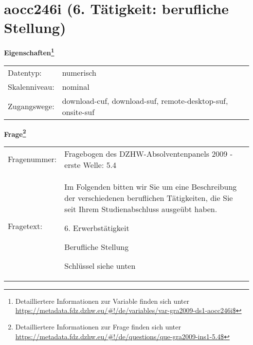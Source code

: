 
    \setcounter{footnote}{0}

    \vspace*{-1.8cm}
	\section{aocc246i (6. Tätigkeit: berufliche Stellung)}
	\label{section:aocc246i}



    \vspace*{0.5cm}
    \noindent\textbf{Eigenschaften\footnote{Detailliertere Informationen zur Variable finden sich unter
		\url{https://metadata.fdz.dzhw.eu/\#!/de/variables/var-gra2009-ds1-aocc246i$}}}\\
	\begin{tabularx}{\hsize}{@{}lX}
	Datentyp: & numerisch \\
	Skalenniveau: & nominal \\
	Zugangswege: &
	  download-cuf, 
	  download-suf, 
	  remote-desktop-suf, 
	  onsite-suf
 \\
    \end{tabularx}



				\vspace*{0.5cm}
                \noindent\textbf{Frage\footnote{Detailliertere Informationen zur Frage finden sich unter
		              \url{https://metadata.fdz.dzhw.eu/\#!/de/questions/que-gra2009-ins1-5.4$}}}\\
				\begin{tabularx}{\hsize}{@{}lX}
					Fragenummer: &
					  Fragebogen des DZHW-Absolventenpanels 2009 - erste Welle:
					  5.4
 \\
					Fragetext: & Im Folgenden bitten wir Sie um eine Beschreibung der verschiedenen beruflichen Tätigkeiten, die Sie seit Ihrem Studienabschluss ausgeübt haben.\par  6. Erwerbstätigkeit\par  Berufliche Stellung\par  Schlüssel siehe unten \\
				\end{tabularx}





